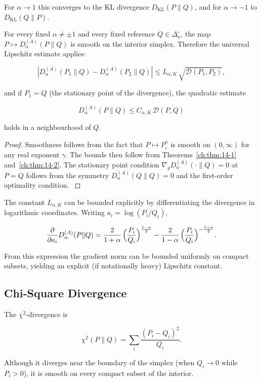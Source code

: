 For \(\alpha\to1\) this converges to the KL divergence
\(D_{\mathrm{KL}}(P\|Q)\), and for \(\alpha\to-1\) to
\(D_{\mathrm{KL}}(Q\|P)\).

\begin{theorem}
\label{ch:thm:alpha-div}
For every fixed \(\alpha\neq\pm1\) and every fixed reference
\(Q\in\Delta_n^\circ\), the map \(P\mapsto D_\alpha^{(A)}(P\|Q)\) is
smooth on the interior simplex.  Therefore the universal Lipschitz
estimate applies:

\[
|D_\alpha^{(A)}(P_1\|Q)-D_\alpha^{(A)}(P_2\|Q)|
\le
L_{\alpha,K}\,\sqrt{\mathcal D(P_1,P_2)},
\]

and if \(P_1=Q\) (the stationary point of the divergence), the
quadratic estimate

\[
D_\alpha^{(A)}(P\|Q)
\le
C_{\alpha,K}\,\mathcal D(P,Q)
\]

holds in a neighbourhood of \(Q\).
\end{theorem}

\begin{proof}
Smoothness follows from the fact that \(P\mapsto P_i^{\gamma}\) is
smooth on \((0,\infty)\) for any real exponent \(\gamma\).  The bounds
then follow from Theorems~\ref{ch:thm:14-1} and~\ref{ch:thm:14-2}.
The stationary point condition \(\nabla_g D_\alpha^{(A)}(\cdot\|Q)=0\)
at \(P=Q\) follows from the symmetry
\(D_\alpha^{(A)}(Q\|Q)=0\) and the first-order optimality condition.
\(\)
\end{proof}

The constant \(L_{\alpha,K}\) can be bounded explicitly by
differentiating the divergence in logarithmic coordinates.  Writing
\(a_i=\log(P_i/Q_i)\),

\[
\frac{\partial}{\partial a_i}D_\alpha^{(A)}(P\|Q)
=
\frac{2}{1+\alpha}
\,
\Bigl(
\frac{P_i}{Q_i}
\Bigr)^{\frac{1-\alpha}{2}}
-
\frac{2}{1-\alpha}
\,
\Bigl(
\frac{P_i}{Q_i}
\Bigr)^{-\frac{1+\alpha}{2}}.
\]

From this expression the gradient norm can be bounded uniformly on
compact subsets, yielding an explicit (if notationally heavy)
Lipschitz constant.

\subsection{Chi-Square Divergence}\label{ch:cor:chi-square}
The \(\chi^2\)-divergence is

\[
\chi^2(P\|Q) = \sum_i \frac{(P_i-Q_i)^2}{Q_i}.
\]

Although it diverges near the boundary of the simplex (when \(Q_i\to0\)
while \(P_i>0\)), it is smooth on every compact subset of the interior.

